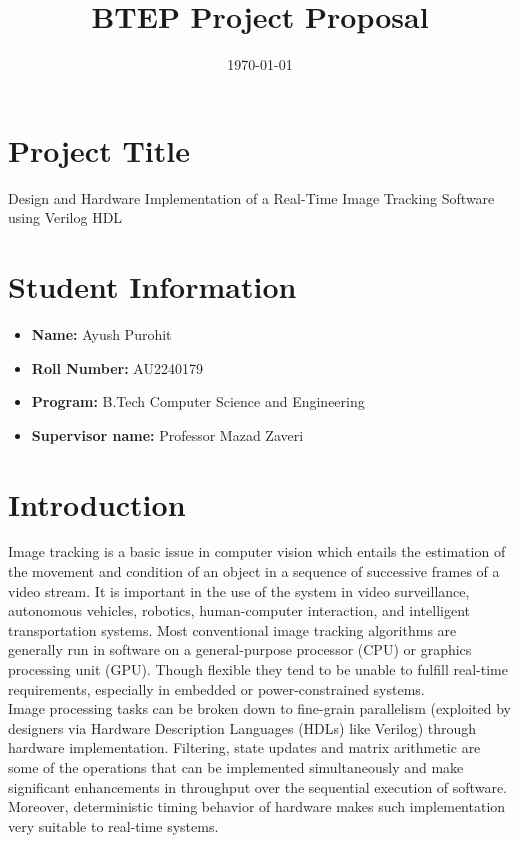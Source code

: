 \documentclass[10pt,a4paper]{article}
\title{\textbf{BTEP Project Proposal}}
\date{\today}
\author{}
\begin{document}
\maketitle

\section*{Project Title}
Design and Hardware Implementation of a Real-Time Image Tracking Software using Verilog HDL

\section*{Student Information}
\begin{itemize}
    \item \textbf{Name:} Ayush Purohit
    \item \textbf{Roll Number:} AU2240179
    \item \textbf{Program:} B.Tech Computer Science and Engineering
    \item \textbf{Supervisor name:} Professor Mazad Zaveri
\end{itemize}

\section*{Introduction}
Image tracking is a basic issue in computer vision which entails the estimation of the movement and condition of an object in a 
sequence of successive frames of a video stream. It is important in the use of the system in video surveillance, autonomous vehicles, robotics, 
human-computer interaction, and intelligent transportation systems. Most conventional image tracking algorithms are generally run in software on a 
general-purpose processor (CPU) or graphics processing unit (GPU). Though flexible they tend to be unable to fulfill real-time requirements, especially in 
embedded or power-constrained systems. \\

\noindent Image processing tasks can be broken down to fine-grain parallelism (exploited by designers via Hardware Description Languages (HDLs) like Verilog) through 
hardware implementation. Filtering, state updates and matrix arithmetic are some of the operations that can be implemented simultaneously and make 
significant enhancements in throughput over the sequential execution of software. Moreover, deterministic timing behavior of hardware makes such 
implementation very suitable to real-time systems. \\
\end{document}
